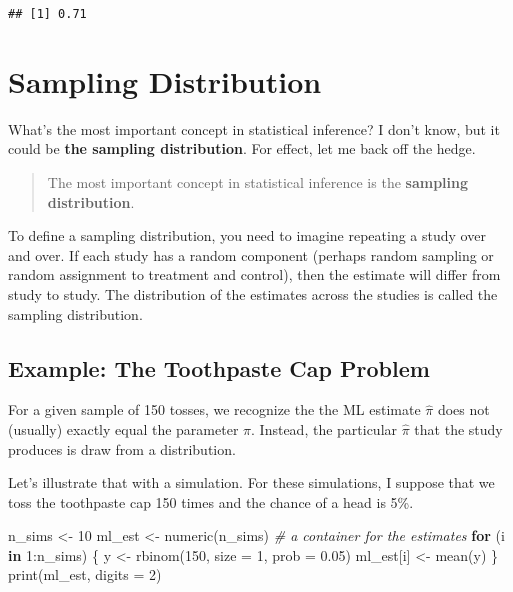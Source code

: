\documentclass[
]{book}
\newenvironment{Shaded}{\begin{snugshade}}{\end{snugshade}}
\newcommand{\AttributeTok}[1]{\textcolor[rgb]{0.77,0.63,0.00}{#1}}
\newcommand{\CommentTok}[1]{\textcolor[rgb]{0.56,0.35,0.01}{\textit{#1}}}
\newcommand{\ControlFlowTok}[1]{\textcolor[rgb]{0.13,0.29,0.53}{\textbf{#1}}}
\newcommand{\DecValTok}[1]{\textcolor[rgb]{0.00,0.00,0.81}{#1}}
\newcommand{\FloatTok}[1]{\textcolor[rgb]{0.00,0.00,0.81}{#1}}
\newcommand{\FunctionTok}[1]{\textcolor[rgb]{0.00,0.00,0.00}{#1}}
\newcommand{\NormalTok}[1]{#1}
\newcommand{\OtherTok}[1]{\textcolor[rgb]{0.56,0.35,0.01}{#1}}
\newcommand{\SpecialCharTok}[1]{\textcolor[rgb]{0.00,0.00,0.00}{#1}}
\begin{document}
\begin{verbatim}
## [1] 0.71
\end{verbatim}

\hypertarget{sampling-distribution}{%
\section{Sampling Distribution}\label{sampling-distribution}}

What's the most important concept in statistical inference? I don't
know, but it could be \textbf{the sampling distribution}. For effect,
let me back off the hedge.

\begin{quote}
The most important concept in statistical inference is the
\textbf{sampling distribution}.
\end{quote}

To define a sampling distribution, you need to imagine repeating a study
over and over. If each study has a random component (perhaps random
sampling or random assignment to treatment and control), then the
estimate will differ from study to study. The distribution of the
estimates across the studies is called the sampling distribution.

\hypertarget{example-the-toothpaste-cap-problem}{%
\subsection{Example: The Toothpaste Cap
Problem}\label{example-the-toothpaste-cap-problem}}

For a given sample of 150 tosses, we recognize the the ML estimate
\(\hat{\pi}\) does not (usually) exactly equal the parameter \(\pi\).
Instead, the particular \(\hat{\pi}\) that the study produces is draw
from a distribution.

Let's illustrate that with a simulation. For these simulations, I
suppose that we toss the toothpaste cap 150 times and the chance of a
head is 5\%.

\begin{Shaded}
\begin{Highlighting}[]
\NormalTok{n\_sims }\OtherTok{\textless{}{-}} \DecValTok{10}
\NormalTok{ml\_est }\OtherTok{\textless{}{-}} \FunctionTok{numeric}\NormalTok{(n\_sims)  }\CommentTok{\# a container for the estimates}
\ControlFlowTok{for}\NormalTok{ (i }\ControlFlowTok{in} \DecValTok{1}\SpecialCharTok{:}\NormalTok{n\_sims) \{}
\NormalTok{  y }\OtherTok{\textless{}{-}} \FunctionTok{rbinom}\NormalTok{(}\DecValTok{150}\NormalTok{, }\AttributeTok{size =} \DecValTok{1}\NormalTok{, }\AttributeTok{prob =} \FloatTok{0.05}\NormalTok{)}
\NormalTok{  ml\_est[i] }\OtherTok{\textless{}{-}} \FunctionTok{mean}\NormalTok{(y)}
\NormalTok{\}}
\FunctionTok{print}\NormalTok{(ml\_est, }\AttributeTok{digits =} \DecValTok{2}\NormalTok{)}
\end{Highlighting}
\end{Shaded}
\end{document}
